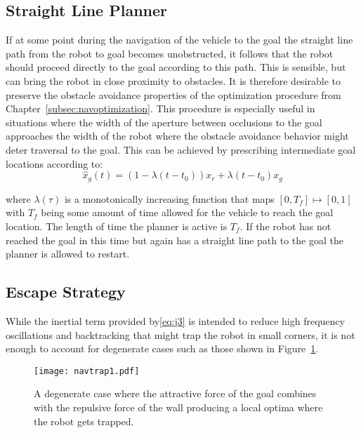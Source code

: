 \subsection{Straight Line Planner}

If at some point during the navigation of the vehicle to the goal the straight line path from the robot to goal becomes
unobstructed, it follows that the robot should proceed directly to the goal according to this path. This is sensible, but
can bring the robot in close proximity to obstacles. It is therefore desirable to preserve the obstacle avoidance properties
of the optimization procedure from Chapter~\ref{subsec:navoptimization}. This procedure is especially useful in situations where the width of the aperture between 
occlusions to the goal approaches the width of the robot where the obstacle avoidance behavior might deter traversal to the goal. 
This can be achieved by prescribing intermediate goal locations
according to:
\begin{equation}
	\hat x_g(t) = (1 - \lambda(t - t_0)) x_r + \lambda (t - t_0) x_g
\label{eq:line_path1}
\end{equation}

where $\lambda(\tau)$ is a monotonically increasing function that maps $[0, T_f] \mapsto [0,1]$ with $T_f$ being some 
amount of time allowed for the vehicle to reach the goal location. The length of time the planner is active is $T_f$.
If the robot has not reached the goal in this time but again has a straight line path to the goal the planner is allowed
to restart.

\subsection{Escape Strategy}\label{subsec:escape_strategy}

While the inertial term provided by\ref{eq:j3} is intended to reduce high frequency oscillations and backtracking that might
trap the robot in small corners, it is not enough to account for degenerate cases such as those shown in Figure~\ref{fig:trap1}.

\begin{figure}
\centering
\texttt{[image: navtrap1.pdf]}
\caption{A degenerate case where the attractive force of the goal combines with the repulsive force of the wall producing a local optima
	     where the robot gets trapped.}
\label{fig:trap1}
\end{figure}

